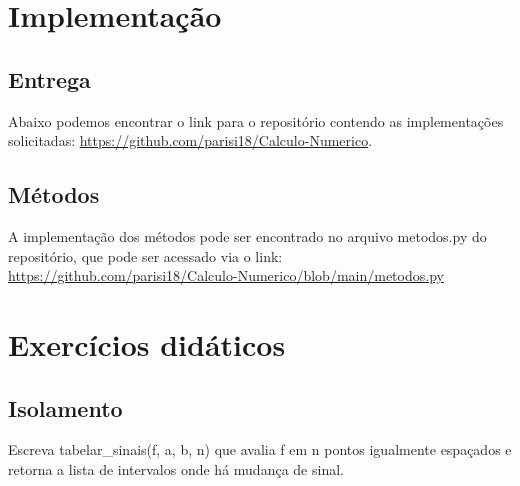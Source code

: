 \documentclass[
	12pt,				%
	openright,			%
	a4paper,			%
	english,			%
	french,				%
	spanish,			%
	brazil,				%
	]{abntex2}
\begin{document}




\chapter{Implementação}

\section{Entrega}
\par Abaixo podemos encontrar o link para o repositório contendo as implementações solicitadas: \url{https://github.com/parisi18/Calculo-Numerico}.

\section{Métodos}
\par A implementação dos métodos pode ser encontrado no arquivo metodos.py do repositório, que pode ser acessado via o link: \url{https://github.com/parisi18/Calculo-Numerico/blob/main/metodos.py}

\chapter{Exercícios didáticos}

\section{Isolamento}

\par Escreva tabelar\_sinais(f, a, b, n) que avalia f em n pontos igualmente espaçados e retorna
a lista de intervalos onde há mudança de sinal.
\end{document}
